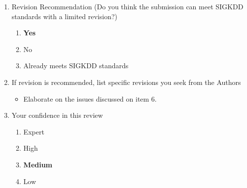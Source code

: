 \documentclass{article}
\begin{document}
\begin{enumerate}
 \item Revision Recommendation (Do you think the submission can meet SIGKDD standards with a limited revision?)
 \begin{enumerate}[I]
  \item \textbf{Yes}
  \item No
  \item Already meets SIGKDD standards
 \end{enumerate}
 
 \item If revision is recommended, list specific revisions you seek from the Authors
 \begin{framed}
  \begin{itemize}
    \item Elaborate on the issues discussed on item 6.
  \end{itemize}
 \end{framed}
 
 \item Your confidence in this review
 \begin{enumerate}[I]
  \item Expert
  \item High
  \item \textbf{Medium}
  \item Low
 \end{enumerate}
 
\end{enumerate}
\end{document}
